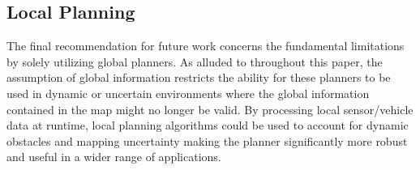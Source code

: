 \subsection{Local Planning}

The final recommendation for future work concerns the fundamental limitations by solely utilizing global planners. As alluded to throughout this paper, the assumption of global information restricts the ability for these planners to be used in dynamic or uncertain environments where the global information contained in the map might no longer be valid. By processing local sensor/vehicle data at runtime, local planning algorithms could be used to account for dynamic obstacles and mapping uncertainty making the planner significantly more robust and useful in a wider range of applications. 
